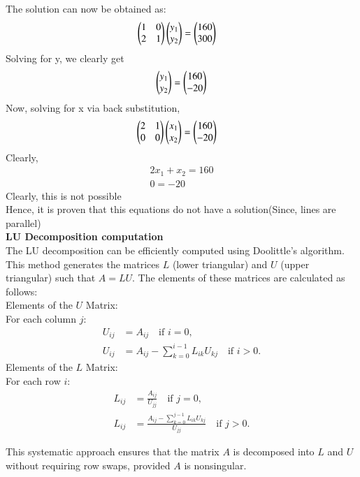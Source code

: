 \documentclass[journal]{IEEEtran}
\begin{document}
The solution can now be obtained as:
\begin{align}
	\begin{pmatrix}1&0\\2&1\end{pmatrix}\begin{pmatrix}y_1 \\ y_2\end{pmatrix} &= \begin{pmatrix}160 \\ 300\end{pmatrix}
\end{align}
Solving for y, we clearly get
\begin{align}
	\begin{pmatrix}y_1 \\ y_2\end{pmatrix} = \begin{pmatrix}160 \\ -20\end{pmatrix}
\end{align}
Now, solving for x via back substitution, 
\begin{align}
	\begin{pmatrix}2&1\\0&0\end{pmatrix}\begin{pmatrix}x_1 \\ x_2\end{pmatrix} &= \begin{pmatrix}160 \\ -20\end{pmatrix}
\end{align}
Clearly, 
\begin{align}
    2x_1+x_2=160\\
    0=-20
\end{align}
Clearly, this is not possible \\
Hence, it is proven that this equations do not have a solution(Since, lines are parallel)\\
\textbf{LU Decomposition computation}\\
The LU decomposition can be efficiently computed using Doolittle's algorithm. This method generates the matrices \( L \) (lower triangular) and \( U \) (upper triangular) such that \( A = LU \). The elements of these matrices are calculated as follows: \\
Elements of the \( U \) Matrix:  \\
For each column \( j \):
\begin{align}
	U_{ij} &= A_{ij} \quad \text{if } i = 0, \\
	U_{ij} &= A_{ij} - \sum_{k=0}^{i-1} L_{ik} U_{kj} \quad \text{if } i > 0.
\end{align}
Elements of the \( L \) Matrix: \\
For each row \( i \):
\begin{align}
	L_{ij} &= \frac{A_{ij}}{U_{jj}} \quad \text{if } j = 0, \\
	L_{ij} &= \frac{A_{ij} - \sum_{k=0}^{j-1} L_{ik} U_{kj}}{U_{jj}} \quad \text{if } j > 0.
\end{align}

This systematic approach ensures that the matrix \( A \) is decomposed into \( L \) and \( U \) without requiring row swaps, provided \( A \) is nonsingular.
\end{document}
